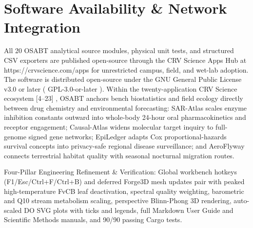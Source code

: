 \documentclass[10pt,letterpaper]{article}
\begin{document}
\section{Software Availability \& Network Integration}
All 20 OSABT analytical source modules, physical unit tests, and structured CSV exporters are published open-source through the CRV Science Apps Hub at https://crvscience.com/apps for unrestricted campus, field, and wet-lab adoption. The software is distributed open-source under the GNU General Public License v3.0 or later ( GPL-3.0-or-later ). Within the twenty-application CRV Science ecosystem [4--23] , OSABT anchors bench biostatistics and field ecology directly between drug chemistry and environmental forecasting: SAR-Atlas scales enzyme inhibition constants outward into whole-body 24-hour oral pharmacokinetics and receptor engagement; Causal-Atlas widens molecular target inquiry to full-genome signed gene networks; EpiLedger adapts Cox proportional-hazards survival concepts into privacy-safe regional disease surveillance; and AeroFlyway connects terrestrial habitat quality with seasonal nocturnal migration routes.

Four-Pillar Engineering Refinement \& Verification: Global workbench hotkeys (F1/Esc/Ctrl+F/Ctrl+B) and deferred Forge3D mesh updates pair with peaked high-temperature FvCB leaf deactivation, spectral quality weighting, barometric and Q10 stream metabolism scaling, perspective Blinn-Phong 3D rendering, auto-scaled DO SVG plots with ticks and legends, full Markdown User Guide and Scientific Methods manuals, and 90/90 passing Cargo tests.
\end{document}
